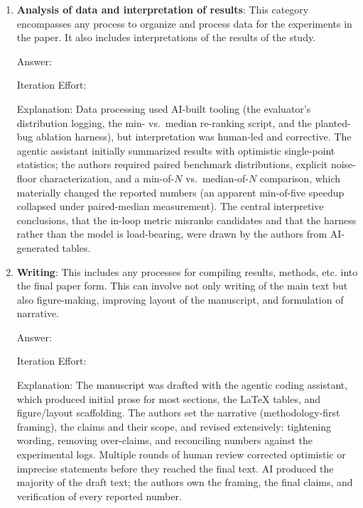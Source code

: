 \documentclass{article}
\begin{document}
\begin{enumerate}
    \item \textbf{Analysis of data and interpretation of results}: This category encompasses any process to organize and process data for the experiments in the paper. It also includes interpretations of the results of the study.

    Answer: \involvementB{}

    Iteration Effort: \iterationHigh{}

    Explanation: Data processing used AI-built tooling (the evaluator's
    distribution logging, the min- vs.\ median re-ranking script, and the
    planted-bug ablation harness), but interpretation was human-led and
    corrective. The agentic assistant initially summarized results with
    optimistic single-point statistics; the authors required paired
    benchmark distributions, explicit noise-floor characterization, and a
    min-of-$N$ vs.\ median-of-$N$ comparison, which materially changed the
    reported numbers (an apparent min-of-five speedup collapsed under
    paired-median measurement). The central interpretive conclusions, that
    the in-loop metric misranks candidates and that the harness rather
    than the model is load-bearing, were drawn by the authors from
    AI-generated tables.

    \item \textbf{Writing}: This includes any processes for compiling results, methods, etc. into the final paper form. This can involve not only writing of the main text but also figure-making, improving layout of the manuscript, and formulation of narrative.

    Answer: \involvementC{}

    Iteration Effort: \iterationHigh{}

    Explanation: The manuscript was drafted with the agentic coding
    assistant, which produced initial prose for most sections, the
    LaTeX tables, and figure/layout scaffolding. The authors set the
    narrative (methodology-first framing), the claims and their scope,
    and revised extensively: tightening wording, removing over-claims,
    and reconciling numbers against the experimental logs. Multiple rounds
    of human review corrected optimistic or imprecise statements before
    they reached the final text. AI produced the majority of the draft
    text; the authors own the framing, the final claims, and verification
    of every reported number.

\end{enumerate}
\end{document}
